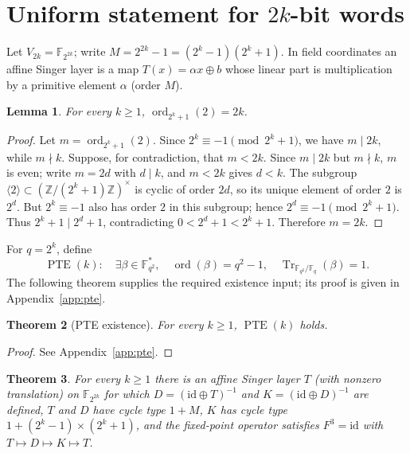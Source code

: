 \documentclass[11pt]{article}
\newtheorem{theorem}{Theorem}[section]
\newtheorem{lemma}[theorem]{Lemma}
\begin{document}
\section[Uniform statement for 2k-bit words]{Uniform statement for $2k$-bit words}\label{sec:2k}
Let $V_{2k}=\mathbb{F}_{2^{2k}}$; write $M=2^{2k}-1=(2^k-1)(2^k+1)$. In field
coordinates an affine Singer layer is a map $T(x)=\alpha x\oplus b$ whose linear part
is multiplication by a primitive element $\alpha$ (order $M$).
\begin{lemma}\label{lem:ord}
For every $k\ge1$, $\operatorname{ord}_{2^k+1}(2)=2k$.
\end{lemma}
\begin{proof}
Let $m=\operatorname{ord}_{2^k+1}(2)$. Since $2^k\equiv-1\pmod{2^k+1}$,
we have $m\mid2k$, while $m\nmid k$. Suppose, for contradiction, that
$m<2k$. Since $m\mid2k$ but $m\nmid k$, $m$ is even; write $m=2d$
with $d\mid k$, and $m<2k$ gives $d<k$. The subgroup
$\langle2\rangle\subset(\mathbb Z/(2^k+1)\mathbb Z)^\times$ is cyclic of order
$2d$, so its unique element of order $2$ is $2^d$. But $2^k\equiv-1$ also has
order $2$ in this subgroup; hence $2^d\equiv-1\pmod{2^k+1}$. Thus
$2^k+1\mid 2^d+1$, contradicting
$0<2^d+1<2^k+1$. Therefore $m=2k$.
\end{proof}
For \(q=2^k\), define
\[
\operatorname{PTE}(k):\quad
\exists\beta\in\mathbb{F}_{q^2}^*,\quad
\operatorname{ord}(\beta)=q^2-1,\quad
\operatorname{Tr}_{\mathbb{F}_{q^2}/\mathbb{F}_q}(\beta)=1.
\]
The following theorem supplies the required existence input; its proof is given in Appendix~\ref{app:pte}.
\begin{theorem}[PTE existence]\label{thm:pte}
For every \(k\ge1\), \(\operatorname{PTE}(k)\) holds.
\end{theorem}
\begin{proof}
See Appendix~\ref{app:pte}.
\end{proof}
\begin{theorem}\label{thm:2k}
For every $k\ge1$ there is an affine Singer layer $T$ (with nonzero translation) on
$\mathbb{F}_{2^{2k}}$ for which $D=(\mathrm{id}\oplus T)^{-1}$ and $K=(\mathrm{id}\oplus D)^{-1}$ are defined,
$T$ and $D$ have cycle type $1+M$, $K$ has cycle type
$1+(2^k-1)\times(2^k+1)$, and the fixed-point operator satisfies $F^3=\mathrm{id}$
with $T\mapsto D\mapsto K\mapsto T$.
\end{theorem}
\end{document}
